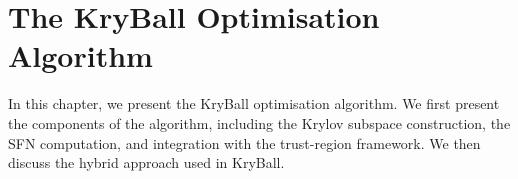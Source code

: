 \chapter{The KryBall Optimisation Algorithm}
\label{chap:method}

In this chapter, we present the KryBall optimisation algorithm. We first present the components of the algorithm, including the Krylov subspace construction, the SFN computation, and integration with the trust-region framework. We then discuss the hybrid approach used in KryBall.

